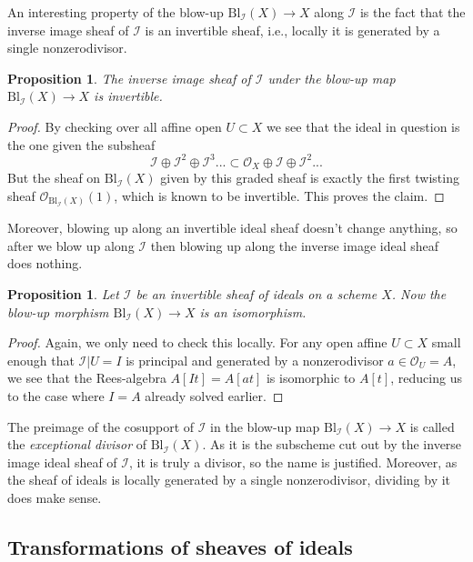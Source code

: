 \documentclass[12pt,a4paper,leqno]{article}
\newcommand{\OO}{\mathcal{O}}
\newcommand{\bl}{\mathrm{Bl}}
\theoremstyle{plain}
\newtheorem{prop}[theo]{Proposition}
\theoremstyle{definition}
\theoremstyle{remark}
\begin{document}
An interesting property of the blow-up $\bl_\mathscr{I} (X) \to X$ along $\mathscr{I}$ is the fact that the inverse image sheaf of $\mathscr{I}$ is an invertible sheaf, i.e., locally it is generated by a single nonzerodivisor.

\begin{prop}
The inverse image sheaf of $\mathscr{I}$ under the blow-up map $\bl_\mathscr{I} (X) \to X$ is invertible.
\end{prop}
\begin{proof}
By checking over all affine open $U \subset X$ we see that the ideal in question is the one given the subsheaf 
\begin{equation*}
\mathscr{I} \oplus \mathscr{I}^2 \oplus \mathscr{I}^3 ... \subset \OO_X \oplus \mathscr{I} \oplus \mathscr{I}^2 ... 
\end{equation*}
But the sheaf on $\bl_\mathscr{I} (X)$ given by this graded sheaf is exactly the first twisting sheaf $\OO_{\bl_\mathscr{I} (X)}(1)$, which is known to be invertible. This proves the claim.
\end{proof}

Moreover, blowing up along an invertible ideal sheaf doesn't change anything, so after we blow up along $\mathscr{I}$ then blowing up along the inverse image ideal sheaf does nothing.

\begin{prop}
Let $\mathscr{I}$ be an invertible sheaf of ideals on a scheme $X$. Now the blow-up morphism $\bl_{\mathscr{I}} (X) \to X$ is an isomorphism.
\end{prop}
\begin{proof}
Again, we only need to check this locally. For any open affine $U \subset X$ small enough that $\mathscr{I}|U = I$ is principal and generated by a nonzerodivisor $a \in \OO_U = A$, we see that the Rees-algebra $A[It] = A[at]$ is isomorphic to $A[t]$, reducing us to the case where $I=A$ already solved earlier.   
\end{proof}

The preimage of the cosupport of $\mathscr{I}$ in the blow-up map $\bl_{\mathscr{I}} (X) \to X$ is called the \emph{exceptional divisor} of $\bl_{\mathscr{I}} (X)$. As it is the subscheme cut out by the inverse image ideal sheaf of $\mathscr{I}$, it is truly a divisor, so the name is justified. Moreover, as the sheaf of ideals is locally generated by a single nonzerodivisor, dividing by it does make sense. 

\subsection{Transformations of sheaves of ideals}
\end{document}
